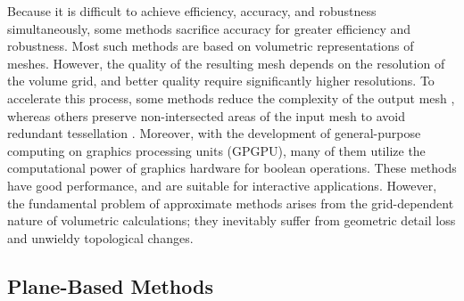 Because it is difficult to achieve efficiency, accuracy, and robustness simultaneously, some methods sacrifice accuracy for greater efficiency and robustness. Most such methods are based on volumetric representations of meshes. However, the quality of the resulting mesh depends on the resolution of the volume grid, and better quality require significantly higher resolutions.
To accelerate this process, some methods reduce the complexity of the output mesh \cite{varadhan2004topology}, whereas others preserve non-intersected areas of the input mesh to avoid redundant tessellation \cite{pavic2010hybrid,wang2011approximate,zhao2011parallel,hable2005blister,ogayar2006gpu}.
Moreover, with the development of general-purpose computing on graphics processing units (GPGPU), many of them utilize the computational power of graphics hardware for boolean operations. These methods have good performance, and are suitable for interactive applications. However, the fundamental problem of approximate methods arises from the grid-dependent nature of volumetric calculations; they inevitably suffer from geometric detail loss and unwieldy topological changes.


\subsection{Plane-Based Methods}
\label{sec:pbrelated}


